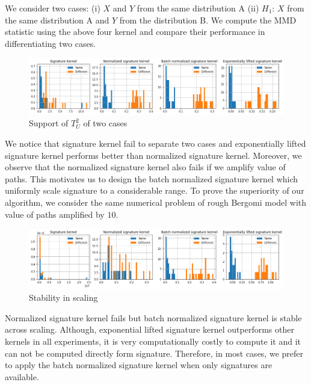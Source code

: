 \documentclass[12pt]{report}
\theoremstyle{definition}
\theoremstyle{remark}
\begin{document}
We consider two cases: (i) $X$ and $Y$ from the same distribution A (ii) $H_{1}$: $X$ from the same distribution A and $Y$ from the distribution B. We compute the MMD statistic using the above four kernel and compare their performance in differentiating two cases.
 \begin{figure}[H]
    \centering
    \includegraphics[width=\textwidth]{figs/estimation4.png}
    \caption{Support of $T_{U}^{2}$ of two cases}
\end{figure}
We notice that signature kernel fail to separate two cases and exponentially lifted signature kernel performs better than normalized signature kernel. Moreover, we observe that the normalized signature kernel also fails if we amplify value of paths. This motivates us to design the batch normalized signature kernel which uniformly scale signature to a considerable range. To prove the superiority of our algorithm, we consider the same numerical problem of rough Bergomi model with value of paths amplified by $10$.
 \begin{figure}[H]
    \centering
    \includegraphics[width=\textwidth]{figs/estimation5.png}
    \caption{Stability in scaling}
\end{figure}
Normalized signature kernel fails but batch normalized signature kernel is stable across scaling. Although, exponential lifted signature kernel outperforms other kernels in all experiments, it is very computationally costly to compute it and it can not be computed directly form signature. Therefore, in most cases, we prefer to apply the batch normalized signature kernel when only signatures are available. 
\end{document}
